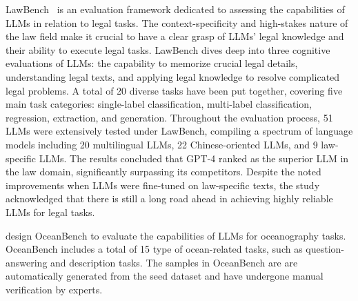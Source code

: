 LawBench~\citep{fei2023lawbench} is an evaluation framework dedicated to assessing the capabilities of LLMs in relation to legal tasks. The context-specificity and high-stakes nature of the law field make it crucial to have a clear grasp of LLMs' legal knowledge and their ability to execute legal tasks. 
LawBench dives deep into three cognitive evaluations of LLMs: the capability to memorize crucial legal details, understanding legal texts, and applying legal knowledge to resolve complicated legal problems. A total of 20 diverse tasks have been put together, covering five main task categories: single-label classification, multi-label classification, regression, extraction, and generation. 
Throughout the evaluation process, 51 LLMs were extensively tested under LawBench, compiling a spectrum of language models including 20 multilingual LLMs, 22 Chinese-oriented LLMs, and 9 law-specific LLMs. The results concluded that GPT-4 ranked as the superior LLM in the law domain, significantly surpassing its competitors. Despite the noted improvements when LLMs were fine-tuned on law-specific texts, the study acknowledged that there is still a long road ahead in achieving highly reliable LLMs for legal tasks.

\citet{bi2023oceangpt}  design OceanBench to evaluate the capabilities of LLMs for oceanography tasks.
OceanBench includes a total of 15 type of ocean-related tasks, such as question-answering and description tasks.
The samples in OceanBench are are automatically generated from the seed dataset and have undergone manual verification by experts.
